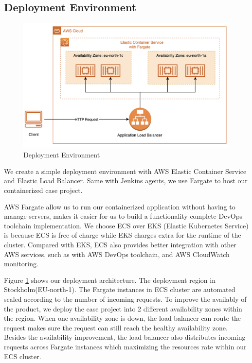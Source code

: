 \subsection{Deployment Environment}
\begin{figure}[h]
 \centering
 \includegraphics[width=0.99\textwidth]{pics/deploy.png}
 \caption{Deployment Environment}
 \label{fig:deploy}
\end{figure}
We create a simple deployment environment with AWS Elastic Container Service and Elastic Load Balancer. Same with Jenkins agents, we use Fargate to host our containerized case project. 
\par
AWS Fargate allow us to run our containerized application without having to manage servers, makes it easier for us to build a functionality complete DevOps toolchain implementation. We choose ECS over EKS (Elastic Kubernetes Service) is because ECS is free of charge while EKS charges extra for the runtime of the cluster. Compared with EKS, ECS also provides better integration with other AWS services, such as with AWS DevOps toolchain, and AWS CloudWatch monitoring.
\par
Figure \ref{fig:deploy}
shows our deployment architecture. The deployment region in Stockholm(EU-north-1). The Fargate instances in ECS cluster are automated scaled according to the number of incoming requests. 
To improve the availably of the product, we deploy the case project into 2 different availability zones within the region. 
When one availability zone is down, the load balancer can route the request makes sure the request can still reach the healthy availability zone. Besides the availability improvement, the load balancer also distributes incoming requests across Fargate instances which maximizing the resources rate within our ECS cluster.
